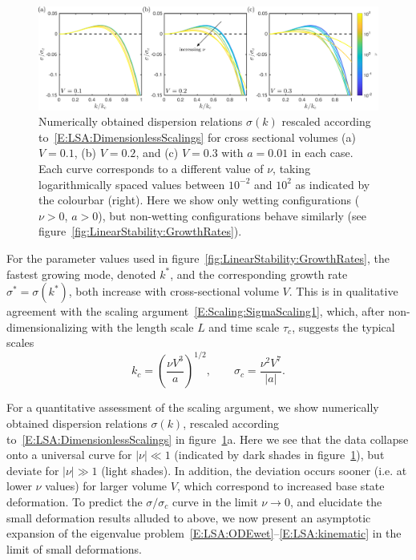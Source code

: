 \documentclass{jfm}
\newcommand{\aspect}{a} %
\begin{document}
\begin{figure}
\centering
\includegraphics[width = \textwidth]{figures/fig7_rescaled_growth_rates.pdf}
\caption{Numerically obtained dispersion relations $\sigma(k)$ rescaled according to~\eqref{E:LSA:DimensionlessScalings} for cross sectional volumes (a) $V = 0.1$, (b) $V = 0.2$, and (c) $V = 0.3$ with $\aspect = 0.01$ in each case. Each curve corresponds to a different value of $\nu$, taking logarithmically spaced values between $10^{-2}$ and $10^{2}$ as indicated by the colourbar (right). Here we show only wetting configurations ($\nu >0$, $a >0$), but non-wetting configurations behave similarly (see figure~\ref{fig:LinearStability:GrowthRates}). }
\label{fig:RescaledGrowthRates}
\end{figure}

For the parameter values used in figure~\ref{fig:LinearStability:GrowthRates}, the fastest growing mode, denoted $k^*$, and the corresponding growth rate $\sigma^* = \sigma(k^*)$, both increase with cross-sectional volume $V$. This is in qualitative agreement with the scaling argument~\eqref{E:Scaling:SigmaScaling1}, which, after non-dimensionalizing with the length scale $L$ and time scale $\tau_c$, suggests the typical scales
\begin{equation}\label{E:LSA:DimensionlessScalings}
k_c  = \left(\frac{\nu V^3}{a}\right)^{1/2}, \qquad \sigma_c = \frac{\nu^2 V^7}{|a|}.
\end{equation}

For a quantitative assessment of the scaling argument, we show numerically obtained dispersion relations $\sigma(k)$, rescaled according to~\eqref{E:LSA:DimensionlessScalings} in figure~\ref{fig:RescaledGrowthRates}a. Here we see that the data collapse onto a universal curve for $|\nu| \ll 1$ (indicated by dark shades in figure~\ref{fig:RescaledGrowthRates}), but deviate for $|\nu|\gg 1$ (light shades). In addition, the deviation occurs sooner (i.e. at lower $\nu$ values) for larger volume $V$, which correspond to increased base state deformation. To predict the $\sigma/\sigma_c$ curve in the limit $\nu \to 0$, and elucidate the small deformation results alluded to above, we now present an asymptotic expansion of the eigenvalue problem~\eqref{E:LSA:ODEwet}--\eqref{E:LSA:kinematic} in the limit of small deformations.
\end{document}
